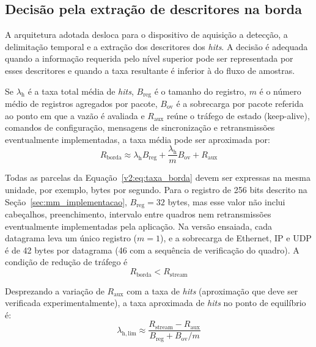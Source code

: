 \subsection{Decisão pela extração de descritores na borda}
\label{v2:subsec:extracao_borda}

A arquitetura adotada desloca para o dispositivo de aquisição a detecção, a delimitação temporal e a extração dos descritores dos \textit{hits}. A decisão é adequada quando a informação requerida pelo nível superior pode ser representada por esses descritores e quando a taxa resultante é inferior à do fluxo de amostras.

Se \(\lambda_{\mathrm{h}}\) é a taxa total média de \textit{hits}, \(B_{\mathrm{reg}}\) é o tamanho do registro, \(m\) é o número médio de registros agregados por pacote, \(B_{\mathrm{ov}}\) é a sobrecarga por pacote referida ao ponto em que a vazão é avaliada e \(R_{\mathrm{aux}}\) reúne o tráfego de estado (keep-alive), comandos de configuração, mensagens de sincronização e retransmissões eventualmente implementadas, a taxa média pode ser aproximada por:
\begin{equation}
	R_{\mathrm{borda}} \approx \lambda_{\mathrm{h}}B_{\mathrm{reg}} + \frac{\lambda_{\mathrm{h}}}{m}B_{\mathrm{ov}} + R_{\mathrm{aux}}
	\label{v2:eq:taxa_borda}
\end{equation}

Todas as parcelas da Equação~\eqref{v2:eq:taxa_borda} devem ser expressas na mesma unidade, por exemplo, bytes por segundo. Para o registro de 256 bits descrito na Seção~\ref{sec:mm_implementacao}, \(B_{\mathrm{reg}}=32\) bytes, mas esse valor não inclui cabeçalhos, preenchimento, intervalo entre quadros nem retransmissões eventualmente implementadas pela aplicação. Na versão ensaiada, cada datagrama leva um único registro (\(m = 1\)), e a sobrecarga de Ethernet, IP e UDP é de 42 bytes por datagrama (46 com a sequência de verificação do quadro). A condição de redução de tráfego é
\begin{equation}
	R_{\mathrm{borda}} < R_{\mathrm{stream}}
	\label{v2:eq:condicao_reducao_borda}
\end{equation}

Desprezando a variação de \(R_{\mathrm{aux}}\) com a taxa de \textit{hits} (aproximação que deve ser verificada experimentalmente), a taxa aproximada de \textit{hits} no ponto de equilíbrio é:
\begin{equation}
	\lambda_{\mathrm{h,lim}} \approx \frac{R_{\mathrm{stream}}-R_{\mathrm{aux}}}{B_{\mathrm{reg}}+B_{\mathrm{ov}}/m}
	\label{v2:eq:taxa_limite_hits}
\end{equation}

